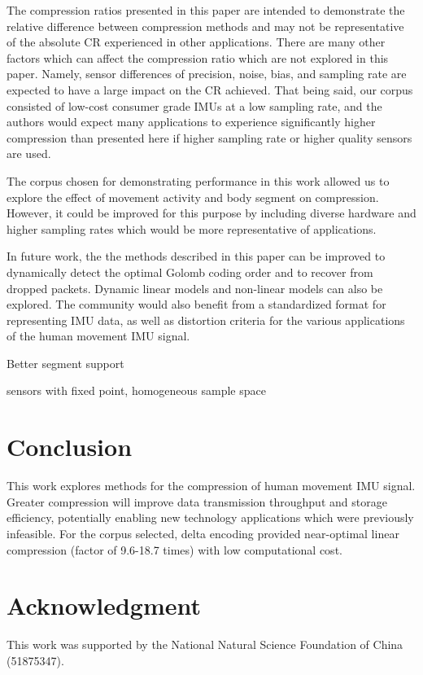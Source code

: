 \documentclass[journal]{IEEEtran}
\begin{document}
The compression ratios presented in this paper are intended to demonstrate the relative difference between compression methods and may not be representative of the absolute CR experienced in other applications. There are many other factors which can affect the compression ratio which are not explored in this paper. Namely, sensor differences of precision, noise, bias, and sampling rate are expected to have a large impact on the CR achieved. That being said, our corpus consisted of low-cost consumer grade IMUs at a low sampling rate, and the authors would expect many applications to experience significantly higher compression than presented here if higher sampling rate or higher quality sensors are used.

The corpus chosen for demonstrating performance in this work allowed us to explore the effect of movement activity and body segment on compression. However, it could be improved for this purpose by including diverse hardware and higher sampling rates which would be more representative of applications.

In future work, the the methods described in this paper can be improved to dynamically detect the optimal Golomb coding order and to recover from dropped packets. Dynamic linear models and non-linear models can also be explored. The community would also benefit from a standardized format for representing IMU data, as well as distortion criteria for the various applications of the human movement IMU signal.

Better segment support

sensors with fixed point, homogeneous sample space

\section{Conclusion}
This work explores methods for the compression of human movement IMU signal. Greater compression will improve data transmission throughput and storage efficiency, potentially enabling new technology applications which were previously infeasible. For the corpus selected, delta encoding provided near-optimal linear compression (factor of 9.6-18.7 times) with low computational cost.

\section*{Acknowledgment}
This work was supported by the National Natural Science
Foundation of China (51875347).
\end{document}
